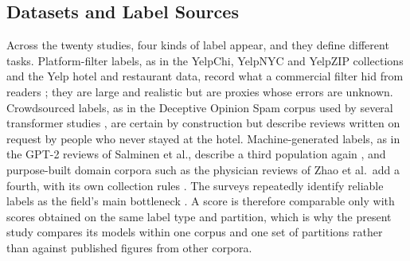 \subsection{Datasets and Label Sources}
Across the twenty studies, four kinds of label appear, and they define different tasks. Platform-filter labels, as in the YelpChi, YelpNYC and YelpZIP collections and the Yelp hotel and restaurant data, record what a commercial filter hid from readers \cite{ref10,ref1}; they are large and realistic but are proxies whose errors are unknown. Crowdsourced labels, as in the Deceptive Opinion Spam corpus used by several transformer studies \cite{ref15,ref6}, are certain by construction but describe reviews written on request by people who never stayed at the hotel. Machine-generated labels, as in the GPT-2 reviews of Salminen et al., describe a third population again \cite{ref17}, and purpose-built domain corpora such as the physician reviews of Zhao et al.\ add a fourth, with its own collection rules \cite{ref20}. The surveys repeatedly identify reliable labels as the field's main bottleneck \cite{ref12,ref13,ref7}. A score is therefore comparable only with scores obtained on the same label type and partition, which is why the present study compares its models within one corpus and one set of partitions rather than against published figures from other corpora.

